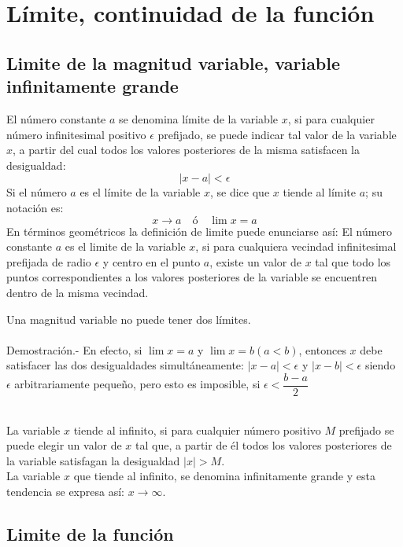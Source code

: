 \chapter{Límite, continuidad de la función}

\section{Limite de la magnitud variable, variable infinitamente grande}

    \begin{tcolorbox}[colframe = white]
	\begin{def.}
	    El número constante $a$ se denomina límite de la variable $x$, si para cualquier número infinitesimal positivo $\epsilon$ prefijado, se puede indicar tal valor de la variable $x$, a partir del cual todos los valores posteriores de la misma satisfacen la desigualdad: $$|x-a| < \epsilon$$ Si el número $a$ es el límite de la variable $x$, se dice que $x$ tiende al límite $a$; su notación es: $$x \longrightarrow a \quad ó \quad \lim x = a$$ En términos geométricos la definición de limite puede enunciarse así: El número constante $a$ es el limite de la variable $x$, si para cualquiera vecindad infinitesimal prefijada de radio $\epsilon$ y centro en el punto $a$, existe un valor de $x$ tal que todo los puntos correspondientes a los valores posteriores de la variable se encuentren dentro de la misma vecindad.
	\end{def.}
    \end{tcolorbox}

    \begin{teo}
	Una magnitud variable no puede tener dos límites.\\\\
	    Demostración.-\; En efecto, si $\lim x = a$ y $\lim x = b (a<b)$, entonces $x$ debe satisfacer las dos desigualdades simultáneamente: $|x-a|<\epsilon$ y $|x-b|<\epsilon$ siendo $\epsilon$ arbitrariamente pequeño, pero esto es imposible, si $\epsilon < \dfrac{b-a}{2}$\\\\
    \end{teo}

    \begin{tcolorbox}[colframe = white]
	\begin{def.}
	    La variable $x$ tiende al infinito, si para cualquier número positivo $M$ prefijado se puede elegir un valor de $x$ tal que, a partir de él todos los valores posteriores de la variable satisfagan la desigualdad $|x|>M$.\\
	    La variable $x$ que tiende al infinito, se denomina infinitamente grande y esta tendencia se expresa así: $x \longrightarrow \infty$. 
	\end{def.}
    \end{tcolorbox}

\section{Limite de la función}

